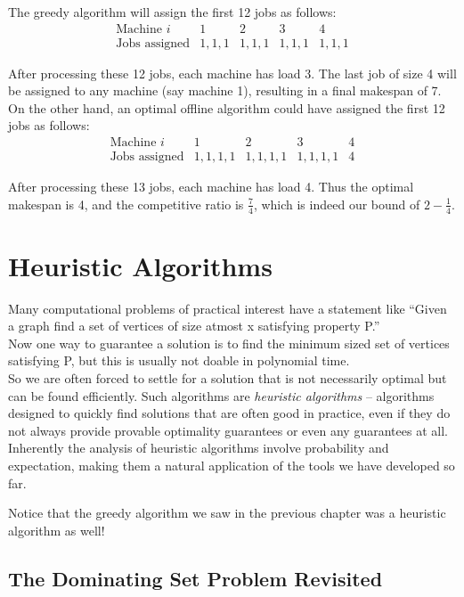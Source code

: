 \documentclass[11pt,openany]{book}
\begin{document}
The greedy algorithm will assign the first 12 jobs as follows:
\[
\begin{array}{c|cccc}
\text{Machine }i & 1 & 2 & 3 & 4\\
\hline
\text{Jobs assigned} & 1,1,1 & 1,1,1 & 1,1,1 & 1,1,1
\end{array}
\]

After processing these 12 jobs, each machine has load 3. The last job of size 4 will be assigned to any machine (say machine 1), resulting in a final makespan of 7.
On the other hand, an optimal offline algorithm could have assigned the first 12 jobs as follows:
\[
\begin{array}{c|cccc}
\text{Machine }i & 1 & 2 & 3 & 4\\
\hline
\text{Jobs assigned} & 1,1,1,1 & 1,1,1,1 & 1,1,1,1 & 4
\end{array}
\]

After processing these 13 jobs, each machine has load 4. Thus the optimal makespan is 4,
 and the competitive ratio is $\frac{7}{4}$, which is indeed our bound of $2-\frac{1}{4}$.

\chapter{Heuristic Algorithms}

Many computational problems of practical interest have a statement like ``Given a graph find a set of vertices of size atmost x satisfying property P.'' \\
Now one way to guarantee a solution is to find the minimum sized set of vertices satisfying P, but this is usually not doable in polynomial time. \\
So we are often forced to settle for a solution that is not necessarily optimal but can be found efficiently. 
Such algorithms are \emph{heuristic algorithms} -- algorithms designed to quickly find solutions that are often good in practice,
even if they do not always provide provable optimality guarantees or even any guarantees at all. \\ 
Inherently the analysis of heuristic algorithms involve probability and expectation, making them a natural application of the tools we have developed so far.

Notice that the greedy algorithm we saw in the previous chapter was a heuristic algorithm as well!
\section{The Dominating Set Problem Revisited}
\end{document}
